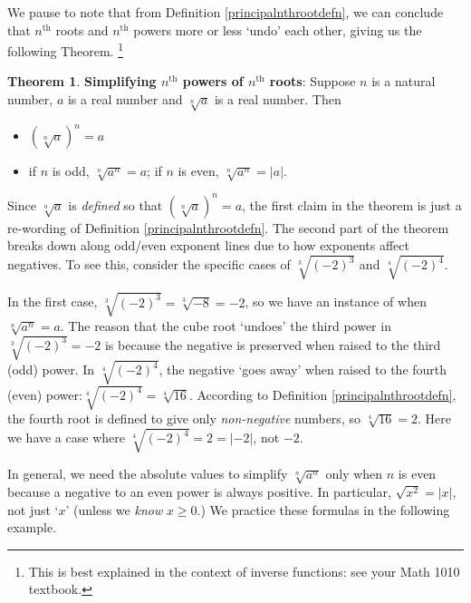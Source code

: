 \documentclass[11pt]{article}
\theoremstyle{definition}  %
\newtheorem{thm}{\bf Theorem}
\newcommand{\bbm}{\begin{boxedminipage}{6.41in}}
\newcommand{\ebm}{\end{boxedminipage}}
\begin{document}
We pause to note that from Definition \ref{principalnthrootdefn}, we can conclude  that $n^{\text{th}}$ roots and $n^{\text{th}}$ powers more or less `undo' each other, giving us the following Theorem. \footnote{This is best explained in the context of inverse functions: see your Math 1010 textbook.}

\medskip

\colorbox{ResultColor}{\bbm

\begin{thm}\label{simplifyradicals} \textbf{Simplifying $n^{\text{th}}$ powers of $n^{\text{th}}$ roots}:  Suppose $n$ is a natural number, $a$ is a real number and $\sqrt[n]{a}$ is a real number.  Then

\begin{itemize}

\item $(\sqrt[n]{a})^{n} = a$

\item  if $n$ is odd, $\sqrt[n]{a^{n}} = a$; if $n$ is even, $\sqrt[n]{a^{n}} = |a|$.

\end{itemize}

\end{thm}

\ebm} 

\medskip

Since $\sqrt[n]{a}$ is \textit{defined} so that $(\sqrt[n]{a})^n = a$,  the first claim in the theorem is just a re-wording of  Definition \ref{principalnthrootdefn}.  The second part of the theorem breaks down along odd/even exponent lines due to how exponents affect negatives. To see this, consider the specific cases of $\sqrt[3]{(-2)^3}$ and $\sqrt[4]{(-2)^{4}}$.  

\medskip

In the first case,  $\sqrt[3]{(-2)^3} =\sqrt[3]{-8} = -2$, so we have an instance of when $\sqrt[n]{a^{n}} = a$.  The reason that the cube root `undoes' the third power in $\sqrt[3]{(-2)^3} = -2$ is because the negative is preserved when raised to the third (odd) power.  In  $\sqrt[4]{(-2)^{4}}$,  the negative `goes away' when raised to the fourth (even) power:$\sqrt[4]{(-2)^{4}} = \sqrt[4]{16}$.  According to Definition \ref{principalnthrootdefn}, the fourth root is defined to give only \textit{non-negative} numbers, so $\sqrt[4]{16} = 2$.  Here we have a case where $\sqrt[4]{(-2)^{4}} = 2 = |-2|$, not $-2$. 

\medskip

In general, we need the absolute values to simplify $\sqrt[n]{a^{n}}$ only when $n$ is even because a negative to an even power is always positive.  In particular, $\sqrt{x^2} = |x|$, not just `$x$' (unless we \textit{know} $x \geq 0$.)  We practice these formulas in the following example.
\end{document}
